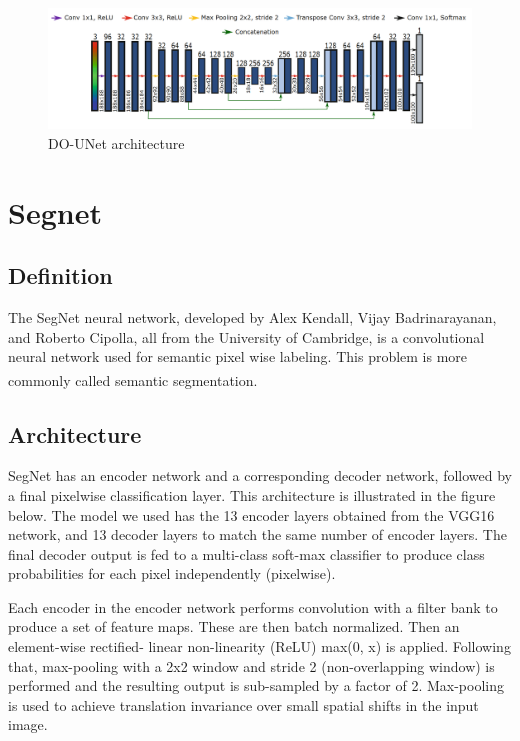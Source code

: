 \begin{figure}[H]
\centering
  \vspace{0.2in}
    \centerline{\includegraphics[width = \linewidth]{../images/DO-UNET.png}}
    \caption{DO-UNet architecture}
    \label{fig:DO-UNET}
\end{figure}

\newpage

\section{Segnet}
\subsection{Definition}
\hspace{\parindent}
The SegNet neural network, developed by Alex Kendall, Vijay Badrinarayanan, and Roberto Cipolla, all from the University of Cambridge, is a convolutional neural network used for semantic pixel wise labeling. This problem is more commonly called semantic segmentation. \textsuperscript{\cite{badrinarayanan2017segnet}}

\subsection{Architecture}
\hspace{\parindent}
SegNet has an encoder network and a corresponding decoder network, followed by a final pixelwise classification layer. This architecture is illustrated in the figure below.
The model we used has the 13 encoder layers obtained from the VGG16 network, and 13 decoder layers to match the same number of encoder layers. The final decoder output is fed to a multi-class soft-max classifier to produce class probabilities for each pixel independently (pixelwise).

Each encoder in the encoder network performs convolution with a filter bank to produce a set of feature maps. These are then batch normalized. Then an element-wise rectified- linear non-linearity (ReLU) max(0, x) is applied. Following that, max-pooling with a 2x2 window and stride 2 (non-overlapping window) is performed and the resulting output is sub-sampled by a factor of 2. Max-pooling is used to achieve translation invariance over small spatial shifts in the input image.

